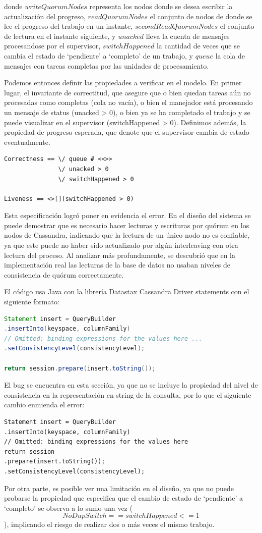 \documentclass[runningheads]{llncs}
\begin{document}
donde $writeQuorumNodes$ representa los nodos donde se desea escribir la actualización del progreso, $readQuorumNodes$ el conjunto de nodos de donde se lee el progreso del trabajo en un instante, $secondReadQuorumNodes$ el conjunto de lectura en el instante siguiente, y $unacked$ lleva la cuenta de mensajes procesandose por el supervisor, $switchHappened$ la cantidad de veces que se cambia el estado de ‘pendiente’ a ‘completo’ de un trabajo, y $queue$ la cola de mensajes con tareas completas por las unidades de procesamiento.

Podemos entonces definir las propiedades a verificar en el modelo. En primer lugar, el invariante de correctitud, que asegure que o bien quedan tareas aún no procesadas como completas (cola no vacía), o bien el manejador está procesando un mensaje de status (unacked > 0), o bien ya se ha completado el trabajo y se puede visualizar en el supervisor (switchHappened > 0). Definimos además, la propiedad de progreso esperada, que denote que el supervisor cambia de estado eventualmente.
%
\begin{lstlisting}
Correctness == \/ queue # <<>>
               \/ unacked > 0
               \/ switchHappened > 0    

Liveness == <>[](switchHappened > 0)
\end{lstlisting}
%
Esta especificación logró poner en evidencia el error. En el diseño del sistema se puede demostrar que es necesario hacer lecturas y escrituras por quórum en los nodos de Cassandra, indicando que la lectura de un único nodo no es confiable, ya que este puede no haber sido actualizado por algún interleaving con otra lectura del proceso. Al analizar más profundamente, se descubrió que en la implementación real las lecturas de la base de datos no usaban niveles de consistencia de quórum correctamente.

El código usa Java con la librería Datastax Cassandra Driver statements con el siguiente formato:
%
\begin{lstlisting}[language=Java]
Statement insert = QueryBuilder
.insertInto(keyspace, columnFamily)
// Omitted: binding expressions for the values here ...
.setConsistencyLevel(consistencyLevel);

return session.prepare(insert.toString());
\end{lstlisting}
%
El bug se encuentra en esta sección, ya que no se incluye la propiedad del nivel de consistencia en la representación en string de la consulta, por lo que el siguiente cambio enmienda el error:
%
\begin{lstlisting}
Statement insert = QueryBuilder
.insertInto(keyspace, columnFamily)
// Omitted: binding expressions for the values here
return session
.prepare(insert.toString());
.setConsistencyLevel(consistencyLevel);
\end{lstlisting}
%
Por otra parte, es posible ver una limitación en el diseño, ya que no puede probarse la propiedad que especifica que el cambio de estado de ‘pendiente’ a ‘completo’ se observa a lo sumo una vez
(\[NoDupSwitch == switchHappened <= 1\]), implicando el riesgo de realizar dos o más veces el mismo trabajo.
\end{document}
